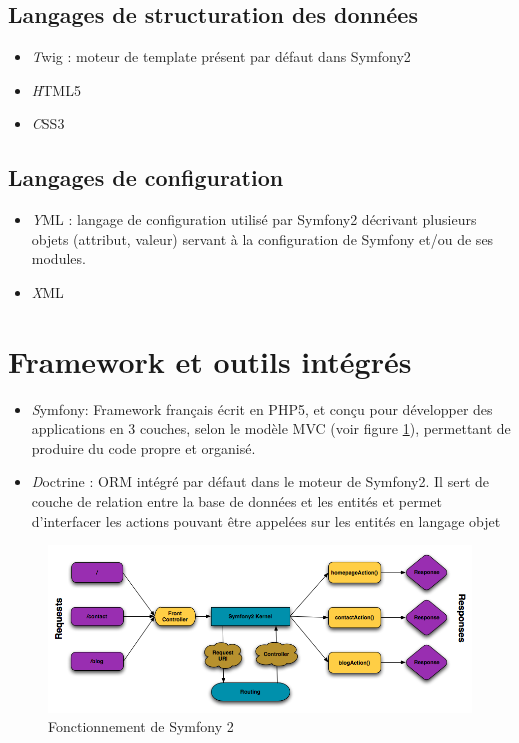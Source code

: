 \documentclass[a4paper,12pt, notitlepage]{report}
\begin{document}
\subsection{Langages de structuration des données}
\begin{itemize}
    \item \emph Twig : moteur de template présent par défaut dans Symfony2
    \item \emph HTML5 
    \item \emph CSS3
\end{itemize}

\subsection{Langages de configuration}
\begin{itemize}
    \item \emph YML : langage de configuration utilisé par Symfony2 décrivant plusieurs objets (attribut, valeur) servant à la configuration de Symfony et/ou de ses modules.
    \item \emph XML 
\end{itemize}
\section{Framework et outils intégrés}
\begin{itemize}
    \item \emph Symfony: Framework français écrit en PHP5, et conçu pour développer des applications en 3 couches, selon le modèle MVC (voir figure \ref{request-flow}), permettant de produire du code propre et organisé.
    \item \emph Doctrine : \gls{ORM} intégré par défaut dans le moteur de Symfony2. Il sert de couche de relation entre la base de données et les entités et permet d’interfacer les actions pouvant être appelées sur les entités en langage objet
\end{itemize}

\begin{figure} 
    \caption{Fonctionnement de Symfony 2}  
    \label{request-flow}
    \centering
    \includegraphics[scale=0.5]{images/request-flow.png}
\end{figure}
\end{document}
